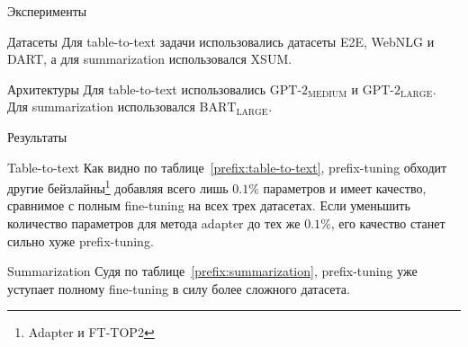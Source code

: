 \documentclass[9pt]{beamer}
\begin{document}
\begin{frame}{Эксперименты}
    
    \begin{block}{Датасеты}
        Для table-to-text задачи использовались датасеты E2E, WebNLG и DART, а для summarization использовался XSUM.
    \end{block}
    
    \begin{block}{Архитектуры}
        Для table-to-text использовались $\text{GPT-2}_{\text{MEDIUM}}$ и $\text{GPT-2}_{\text{LARGE}}$. Для summarization использовался $\text{BART}_{\text{LARGE}}$.
    \end{block}

\end{frame}

\begin{frame}{Результаты}

    \begin{block}{Table-to-text}
        Как видно по таблице~\ref{prefix:table-to-text}, prefix-tuning обходит другие бейзлайны\footnote{Adapter и FT-TOP2} добавляя всего лишь $0.1\%$ параметров и имеет качество, сравнимое с полным fine-tuning на всех трех датасетах. Если уменьшить количество параметров для метода adapter до тех же $0.1\%$, его качество станет сильно хуже prefix-tuning.
    \end{block}

    \begin{block}{Summarization}
        Судя по таблице~\ref{prefix:summarization}, prefix-tuning уже уступает полному fine-tuning в силу более сложного датасета.
    \end{block}

\end{frame}
\end{document}
